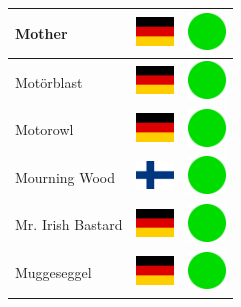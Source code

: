 \documentclass[12pt, a4paper, twoside]{report}
\begin{document}
\begin{center}
\begin{longtable}{|p{5cm}|p{2cm}|p{2cm}|}
 Mother                                                     & \includegraphics[width=1cm]{../4x3/de} &   \includegraphics[width=1cm]{../likes/y} \\ \hline
 Motörblast                                                 & \includegraphics[width=1cm]{../4x3/de} &   \includegraphics[width=1cm]{../likes/y} \\ \hline
 Motorowl                                                   & \includegraphics[width=1cm]{../4x3/de} &   \includegraphics[width=1cm]{../likes/y} \\ \hline
 Mourning Wood                                              & \includegraphics[width=1cm]{../4x3/fi} &   \includegraphics[width=1cm]{../likes/y} \\ \hline
 Mr. Irish Bastard                                          & \includegraphics[width=1cm]{../4x3/de} &   \includegraphics[width=1cm]{../likes/y} \\ \hline
 Muggeseggel                                                & \includegraphics[width=1cm]{../4x3/de} &   \includegraphics[width=1cm]{../likes/y} \\ \hline

\end{longtable}
\end{center}
\end{document}
